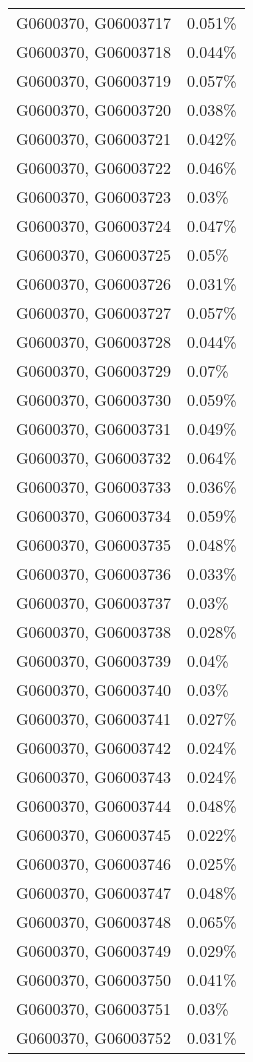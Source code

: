 \begin{longtable}[]{@{}ll@{}}
G0600370, G06003717 & 0.051\% \\
G0600370, G06003718 & 0.044\% \\
G0600370, G06003719 & 0.057\% \\
G0600370, G06003720 & 0.038\% \\
G0600370, G06003721 & 0.042\% \\
G0600370, G06003722 & 0.046\% \\
G0600370, G06003723 & 0.03\% \\
G0600370, G06003724 & 0.047\% \\
G0600370, G06003725 & 0.05\% \\
G0600370, G06003726 & 0.031\% \\
G0600370, G06003727 & 0.057\% \\
G0600370, G06003728 & 0.044\% \\
G0600370, G06003729 & 0.07\% \\
G0600370, G06003730 & 0.059\% \\
G0600370, G06003731 & 0.049\% \\
G0600370, G06003732 & 0.064\% \\
G0600370, G06003733 & 0.036\% \\
G0600370, G06003734 & 0.059\% \\
G0600370, G06003735 & 0.048\% \\
G0600370, G06003736 & 0.033\% \\
G0600370, G06003737 & 0.03\% \\
G0600370, G06003738 & 0.028\% \\
G0600370, G06003739 & 0.04\% \\
G0600370, G06003740 & 0.03\% \\
G0600370, G06003741 & 0.027\% \\
G0600370, G06003742 & 0.024\% \\
G0600370, G06003743 & 0.024\% \\
G0600370, G06003744 & 0.048\% \\
G0600370, G06003745 & 0.022\% \\
G0600370, G06003746 & 0.025\% \\
G0600370, G06003747 & 0.048\% \\
G0600370, G06003748 & 0.065\% \\
G0600370, G06003749 & 0.029\% \\
G0600370, G06003750 & 0.041\% \\
G0600370, G06003751 & 0.03\% \\
G0600370, G06003752 & 0.031\% \\

\end{longtable}
